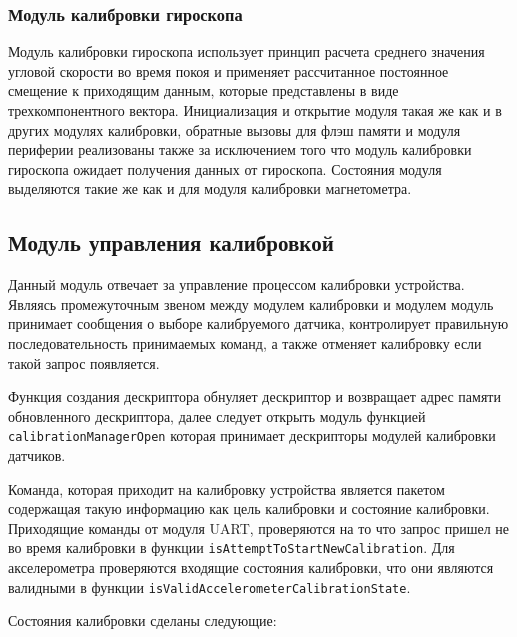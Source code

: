 \subsubsection{Модуль калибровки гироскопа}

Модуль калибровки гироскопа использует принцип расчета среднего значения угловой скорости во время покоя и применяет
рассчитанное постоянное смещение к приходящим данным, которые представлены в виде трехкомпонентного вектора.
Инициализация и открытие модуля такая же как и в других модулях калибровки,
обратные вызовы для флэш памяти и модуля периферии реализованы также за исключением того что модуль калибровки гироскопа ожидает получения данных от гироскопа.
Состояния модуля выделяются такие же как и для модуля калибровки магнетометра.

\subsection{Модуль управления калибровкой}

Данный модуль отвечает за управление процессом калибровки устройства. Являясь промежуточным звеном между модулем калибровки и модулем \moduleUart
модуль принимает сообщения о выборе калибруемого датчика, контролирует правильную последовательность принимаемых команд, а также отменяет
калибровку если такой запрос появляется.

Функция создания дескриптора обнуляет дескриптор и возвращает адрес памяти обновленного дескриптора, далее следует открыть модуль функцией
\lstinline{calibrationManagerOpen} которая принимает дескрипторы модулей калибровки датчиков.

Команда, которая приходит на калибровку устройства является пакетом содержащая такую информацию как цель калибровки и состояние калибровки.
Приходящие команды от модуля UART, проверяются на то что запрос пришел не во время калибровки в функции \lstinline{isAttemptToStartNewCalibration}.
Для акселерометра проверяются входящие состояния калибровки, что они являются валидными в функции \lstinline{isValidAccelerometerCalibrationState}.

Состояния калибровки сделаны следующие:

